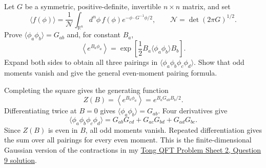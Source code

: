 Let $G$ be a symmetric, positive-definite, invertible $n\times n$
matrix, and set
\begin{equation}
    \langle f(\phi)\rangle
    =\frac1{\mathcal N}\int_{\mathbb R^n}d^n\phi\,
    f(\phi)e^{-\phi\cdot G^{-1}\phi/2},
    \qquad \mathcal N=\det(2\pi G)^{1/2}.
\end{equation}
Prove $\langle\phi_a\phi_b\rangle=G_{ab}$ and, for constant $B_a$,
\begin{equation}
    \left\langle e^{B_a\phi_a}\right\rangle
    =\exp\!\left[\frac12B_a\langle\phi_a\phi_b\rangle B_b\right].
\end{equation}
Expand both sides to obtain all three pairings in
$\langle\phi_a\phi_b\phi_c\phi_d\rangle$. Show that odd moments
vanish and give the general even-moment pairing formula.
\begin{solution}
    Completing the square gives the generating function
    \begin{equation}
        Z(B)=\left\langle e^{B_a\phi_a}\right\rangle
        =e^{B_aG_{ab}B_b/2}.
    \end{equation}
    Differentiating twice at $B=0$ gives $\langle\phi_a\phi_b\rangle=G_{ab}$. Four derivatives give
    \begin{equation}
        \langle\phi_a\phi_b\phi_c\phi_d\rangle
        =G_{ab}G_{cd}+G_{ac}G_{bd}+G_{ad}G_{bc}.
    \end{equation}
    Since $Z(B)$ is even in $B$, all odd moments vanish. Repeated differentiation gives the sum over all pairings for every even moment. This is the finite-dimensional Gaussian version of the contractions in my \href{https://luca-yucheng-jin.github.io/luca-physics-site/notes/tong-qft-ps2.html#wicks-theorem-for-three-fields-q9}{Tong QFT Problem Sheet 2, Question 9 solution}.
\end{solution}
